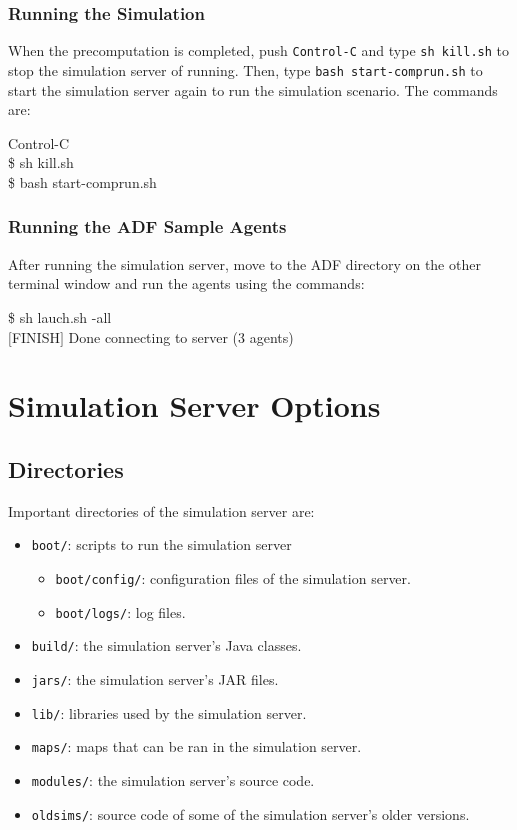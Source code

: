 \documentclass{article}
\begin{document}
\subsubsection{Running the Simulation}
When the precomputation is completed, push \texttt{Control-C} and type \texttt{sh kill.sh} to stop the simulation server of running. Then, type \texttt{bash start-comprun.sh} to start the simulation server again to run the simulation scenario. The commands are:
\begin{center}
   \begin{tcolorbox}[title=Running Simulation Server, width=.98\linewidth]
    {\ttfamily
    Control-C\\
    \$ sh kill.sh\\
    \$ bash start-comprun.sh
    }
  \end{tcolorbox}
\end{center}
\subsubsection{Running the ADF Sample Agents}
After running the simulation server, move to the ADF directory on the other terminal window and run the agents using the commands:
\begin{center}
   \begin{tcolorbox}[title=Running Sample Agents, width=.98\linewidth]
    {\ttfamily
    \$ sh lauch.sh -all\\
    $[$FINISH$]$ Done connecting to server (3 agents)
    }
  \end{tcolorbox}
\end{center}
\section{Simulation Server Options}
\subsection{Directories}
Important directories of the simulation server are:
\begin{itemize}
 \item \texttt{boot/}: scripts to run the simulation server
       \begin{itemize}
         \item \texttt{boot/config/}: configuration files of the simulation server.
         \item \texttt{boot/logs/}: log files.
       \end{itemize}
 \item \texttt{build/}: the simulation server's Java classes.
 \item \texttt{jars/}: the simulation server's JAR files.
 \item \texttt{lib/}: libraries used by the simulation server.
 \item \texttt{maps/}: maps that can be ran in the simulation server.
 \item \texttt{modules/}: the simulation server's source code.
 \item \texttt{oldsims/}: source code of some of the simulation server's older versions.
\end{itemize}
\end{document}
